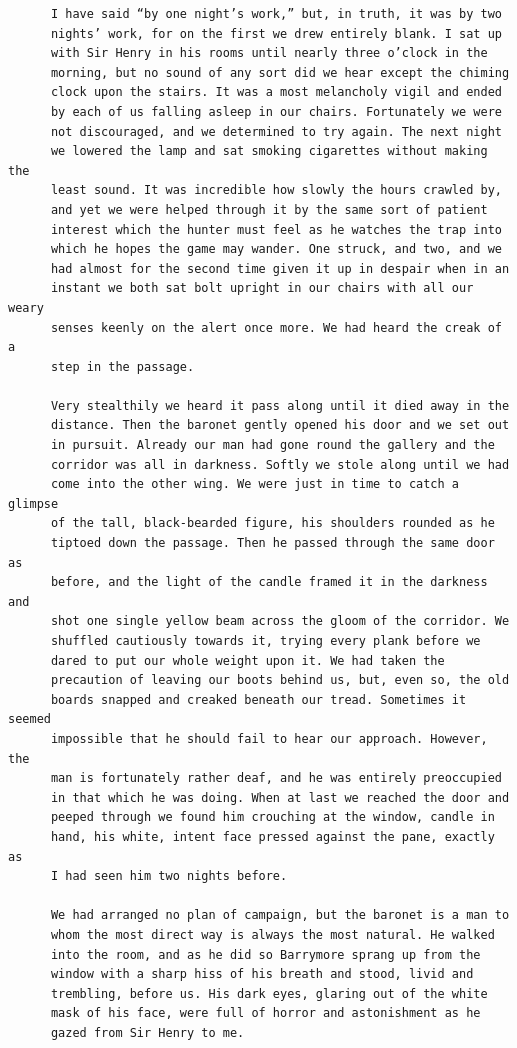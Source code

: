 \documentclass{article}
\begin{document}
\begin{verbatim}
      I have said “by one night’s work,” but, in truth, it was by two
      nights’ work, for on the first we drew entirely blank. I sat up
      with Sir Henry in his rooms until nearly three o’clock in the
      morning, but no sound of any sort did we hear except the chiming
      clock upon the stairs. It was a most melancholy vigil and ended
      by each of us falling asleep in our chairs. Fortunately we were
      not discouraged, and we determined to try again. The next night
      we lowered the lamp and sat smoking cigarettes without making the
      least sound. It was incredible how slowly the hours crawled by,
      and yet we were helped through it by the same sort of patient
      interest which the hunter must feel as he watches the trap into
      which he hopes the game may wander. One struck, and two, and we
      had almost for the second time given it up in despair when in an
      instant we both sat bolt upright in our chairs with all our weary
      senses keenly on the alert once more. We had heard the creak of a
      step in the passage.

      Very stealthily we heard it pass along until it died away in the
      distance. Then the baronet gently opened his door and we set out
      in pursuit. Already our man had gone round the gallery and the
      corridor was all in darkness. Softly we stole along until we had
      come into the other wing. We were just in time to catch a glimpse
      of the tall, black-bearded figure, his shoulders rounded as he
      tiptoed down the passage. Then he passed through the same door as
      before, and the light of the candle framed it in the darkness and
      shot one single yellow beam across the gloom of the corridor. We
      shuffled cautiously towards it, trying every plank before we
      dared to put our whole weight upon it. We had taken the
      precaution of leaving our boots behind us, but, even so, the old
      boards snapped and creaked beneath our tread. Sometimes it seemed
      impossible that he should fail to hear our approach. However, the
      man is fortunately rather deaf, and he was entirely preoccupied
      in that which he was doing. When at last we reached the door and
      peeped through we found him crouching at the window, candle in
      hand, his white, intent face pressed against the pane, exactly as
      I had seen him two nights before.

      We had arranged no plan of campaign, but the baronet is a man to
      whom the most direct way is always the most natural. He walked
      into the room, and as he did so Barrymore sprang up from the
      window with a sharp hiss of his breath and stood, livid and
      trembling, before us. His dark eyes, glaring out of the white
      mask of his face, were full of horror and astonishment as he
      gazed from Sir Henry to me.


\end{verbatim}
\end{document}
